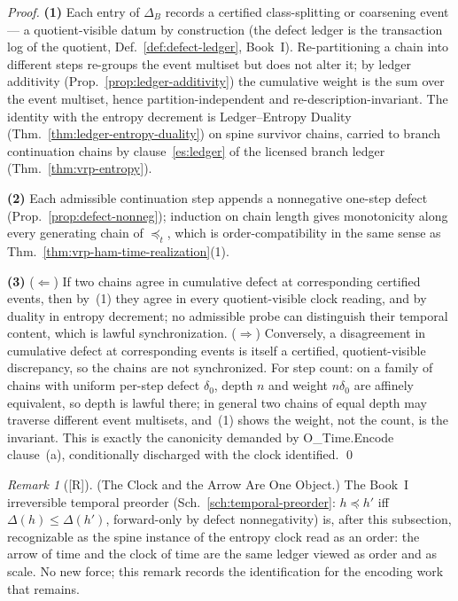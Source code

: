 \documentclass[12pt,oneside]{amsbook}
\theoremstyle{plain}
\theoremstyle{definition}
\theoremstyle{remark}
\newtheorem{remark}[theorem]{Remark}
\newcommand{\status}[1]{\textup{[#1]}}
\begin{document}
\begin{proof}
\textbf{(1)}  Each entry of $\Delta_B$ records a certified
class-splitting or coarsening event --- a quotient-visible datum
by construction (the defect ledger is the transaction log of the
quotient, Def.~\ref{def:defect-ledger}, Book~I).
Re-partitioning a chain into different steps re-groups the event
multiset but does not alter it; by ledger additivity
(Prop.~\ref{prop:ledger-additivity}) the cumulative weight is the
sum over the event multiset, hence partition-independent and
re-description-invariant.  The identity with the entropy decrement
is Ledger--Entropy Duality
(Thm.~\ref{thm:ledger-entropy-duality}) on spine survivor chains,
carried to branch continuation chains by clause~\ref{es:ledger} of
the licensed branch ledger (Thm.~\ref{thm:vrp-entropy}).

\textbf{(2)}  Each admissible continuation step appends a
nonnegative one-step defect (Prop.~\ref{prop:defect-nonneg});
induction on chain length gives monotonicity along every
generating chain of $\preceq_t$, which is order-compatibility in
the same sense as Thm.~\ref{thm:vrp-ham-time-realization}(1).

\textbf{(3)}  ($\Leftarrow$)  If two chains agree in cumulative
defect at corresponding certified events, then by~(1) they agree
in every quotient-visible clock reading, and by duality in entropy
decrement; no admissible probe can distinguish their temporal
content, which is lawful synchronization.  ($\Rightarrow$)
Conversely, a disagreement in cumulative defect at corresponding
events is itself a certified, quotient-visible discrepancy, so the
chains are not synchronized.  For step count: on a family of
chains with uniform per-step defect $\delta_0$, depth $n$ and
weight $n\delta_0$ are affinely equivalent, so depth is lawful
there; in general two chains of equal depth may traverse different
event multisets, and~(1) shows the weight, not the count, is the
invariant.  This is exactly the canonicity demanded by
O\_Time.Encode clause~(a), conditionally discharged with the
clock identified. \qed
\end{proof}

\begin{remark}[\status{R}]\label{rmk:vrp-entropy-clock-arrow}
\textup{(The Clock and the Arrow Are One Object.)}
The Book~I irreversible temporal preorder
(Sch.~\ref{sch:temporal-preorder}: $h \preceq h'$ iff
$\Delta(h) \le \Delta(h')$, forward-only by defect nonnegativity)
is, after this subsection, recognizable as the spine instance of
the entropy clock read as an order: the arrow of time and the
clock of time are the same ledger viewed as order and as scale.
No new force; this remark records the identification for the
encoding work that remains.
\end{remark}
\end{document}
